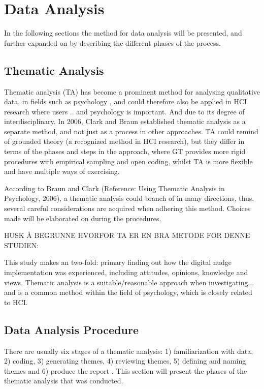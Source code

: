    \section{Data Analysis}
    In the following sections the method for data analysis will be presented, and further expanded on by describing the different phases of the process.  
    
    \subsection{Thematic Analysis}
    Thematic analysis (TA) has become a prominent method for analysing qualitative data, in fields such as psychology \cite{braun_using_2006}, and could therefore also be applied in HCI research where users .. and psychology is important. And due to its degree of interdisciplinary. In 2006, Clark and Braun established thematic analysis as a separate method, and not just as a process in other approaches. TA could remind of grounded theory (a recognized method in HCI research), but they differ in terms of the phases and steps in the approach, where GT provides more rigid procedures with empirical sampling and open coding, whilst TA is more flexible and have multiple ways of exercising. 

    According to Braun and Clark (Reference: Using Thematic Analysis in Psychology, 2006), a thematic analysis could branch of in many directions, thus, several careful considerations are acquired when adhering this method. Choices made will be elaborated on during the procedures.   
    
     HUSK Å BEGRUNNE HVORFOR TA ER EN BRA METODE FOR DENNE STUDIEN: 
    
    This study makes an two-fold: primary finding out how the digital nudge implementation was experienced, including attitudes, opinions, knowledge and views. Thematic analysis is a suitable/reasonable approach when investigating... and is a common method within the field of psychology, which is closely related to HCI.
    
    
    \subsection{Data Analysis Procedure}
    There are usually six stages of a thematic analysis: 1) familiarization with data, 2) coding, 3) generating themes, 4) reviewing themes, 5) defining and naming themes and 6) produce the report \cite{braun_using_2006}. This section will present the phases of the thematic analysis that was conducted. 
    
